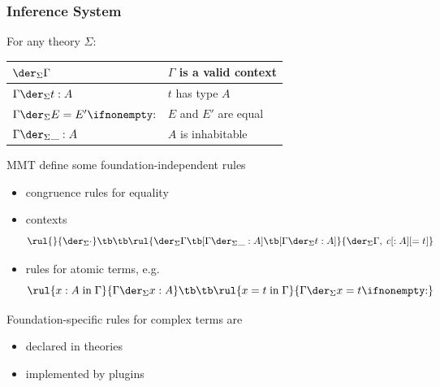 \documentclass{beamer}
\begin{document}
\begin{frame}\frametitle{Inference System}
For any theory $\Sigma$:
	\begin{center}
		\begin{tabular}{|l|l|}
			\hline
			$\iscont{\Sigma}{\Gamma}$         & $\Gamma$ is a valid context \\
			\hline
			$\oftype{\Sigma}{\Gamma}{t}{A}$   & $t$ has type $A$ \\
			$\isequal{\Sigma}{\Gamma}{E}{E'}$ & $E$ and $E'$ are equal \\
			$\isinh{\Sigma}{\Gamma}{A}$      & $A$ is inhabitable \\
			\hline
		\end{tabular}
	\end{center}

MMT define some foundation-independent rules
 \begin{itemize}
   \item congruence rules for equality
   \item contexts
    \[\rul{}
          {\iscont{\Sigma}{\cdot}} \tb\tb
      \rul{\iscont{\Sigma}{\Gamma} \tb [\isinh{\Sigma}{\Gamma}{A}] \tb [\oftype{\Sigma}{\Gamma}{t}{A}]}
          {\iscont{\Sigma}{\Gamma,\; c[:A][=t]}}\]
   \item rules for \alert{atomic terms}, e.g.
     \[\rul{x:A \;\text{in}\; \Gamma}{\oftype{\Sigma}{\Gamma}{x}{A}}\tb\tb
       \rul{x=t \;\text{in}\; \Gamma}{\isequal{\Sigma}{\Gamma}{x}{t}}
     \]
 \end{itemize}
Foundation-specific rules for \alert{complex terms} are
 \begin{itemize}
   \item declared in theories
   \item implemented by plugins
 \end{itemize}
\end{frame}
\end{document}

